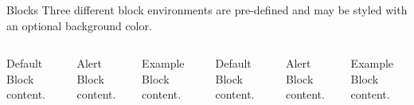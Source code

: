 \documentclass[10pt, hyperref={pdfpagelabels=false}]{beamer}
\begin{document}
\begin{frame}{Blocks}
  Three different block environments are pre-defined and may be styled with an
  optional background color.

  \begin{columns}[T,onlytextwidth]
      \begin{block}{Default}
        Block content.
      \end{block}

      \begin{alertblock}{Alert}
        Block content.
      \end{alertblock}

      \begin{exampleblock}{Example}
        Block content.
      \end{exampleblock}



      \begin{block}{Default}
        Block content.
      \end{block}

      \begin{alertblock}{Alert}
        Block content.
      \end{alertblock}

      \begin{exampleblock}{Example}
        Block content.
      \end{exampleblock}

  \end{columns}
\end{frame}
\end{document}

